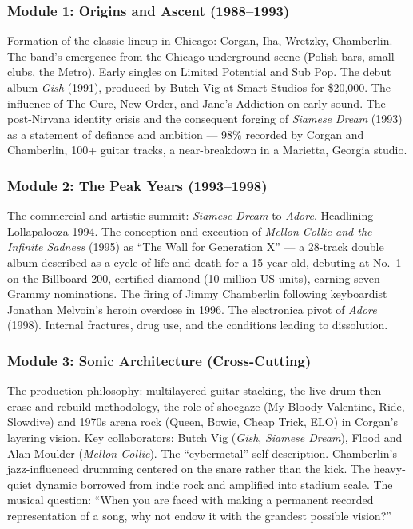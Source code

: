 \documentclass[11pt,letterpaper]{article}
\begin{document}
\subsubsection{Module 1: Origins and Ascent (1988--1993)}

Formation of the classic lineup in Chicago: Corgan, Iha, Wretzky, Chamberlin. The band's emergence from the Chicago underground scene (Polish bars, small clubs, the Metro). Early singles on Limited Potential and Sub Pop. The debut album \textit{Gish} (1991), produced by Butch Vig at Smart Studios for \$20,000. The influence of The Cure, New Order, and Jane's Addiction on early sound. The post-Nirvana identity crisis and the consequent forging of \textit{Siamese Dream} (1993) as a statement of defiance and ambition --- 98\% recorded by Corgan and Chamberlin, 100+ guitar tracks, a near-breakdown in a Marietta, Georgia studio.

\subsubsection{Module 2: The Peak Years (1993--1998)}

The commercial and artistic summit: \textit{Siamese Dream} to \textit{Adore}. Headlining Lollapalooza 1994. The conception and execution of \textit{Mellon Collie and the Infinite Sadness} (1995) as ``The Wall for Generation X'' --- a 28-track double album described as a cycle of life and death for a 15-year-old, debuting at No.\ 1 on the Billboard 200, certified diamond (10 million US units), earning seven Grammy nominations. The firing of Jimmy Chamberlin following keyboardist Jonathan Melvoin's heroin overdose in 1996. The electronica pivot of \textit{Adore} (1998). Internal fractures, drug use, and the conditions leading to dissolution.

\subsubsection{Module 3: Sonic Architecture (Cross-Cutting)}

The production philosophy: multilayered guitar stacking, the live-drum-then-erase-and-rebuild methodology, the role of shoegaze (My Bloody Valentine, Ride, Slowdive) and 1970s arena rock (Queen, Bowie, Cheap Trick, ELO) in Corgan's layering vision. Key collaborators: Butch Vig (\textit{Gish}, \textit{Siamese Dream}), Flood and Alan Moulder (\textit{Mellon Collie}). The ``cybermetal'' self-description. Chamberlin's jazz-influenced drumming centered on the snare rather than the kick. The heavy-quiet dynamic borrowed from indie rock and amplified into stadium scale. The musical question: ``When you are faced with making a permanent recorded representation of a song, why not endow it with the grandest possible vision?''
\end{document}

